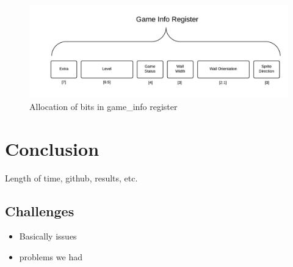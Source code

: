 \documentclass[11pt]{article}
\begin{document}
					
		\begin{figure}[t!]\centering
		  \includegraphics[width=.8\textwidth]{Images/game_info_bits.png}
		  \caption{Allocation of bits in game\_info register}
		  \label{game_info_bits}
		\end{figure}
		
		

		
	


\section{Conclusion}
Length of time, github, results, etc.

	\subsection{Challenges}
		
		\begin{itemize}				
	
		\item Basically issues 
		
		\item problems we had
				
		\end{itemize}
\end{document}
